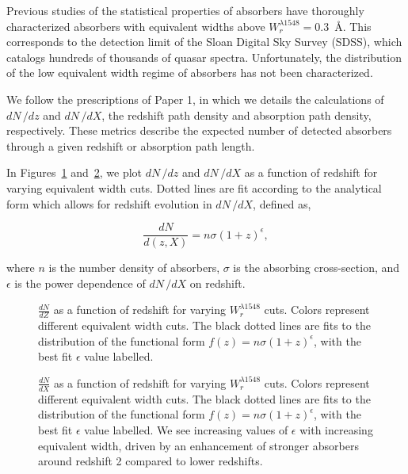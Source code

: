 \documentclass[linenumbers,twocolumn]{aastex61}
\begin{document}
Previous studies of the statistical properties of {\CIV} absorbers have thoroughly characterized {\CIV} absorbers with equivalent widths above $W_r^{\lambda1548} = 0.3$~{\AA}. This corresponds to the detection limit of the Sloan Digital Sky Survey (SDSS), which catalogs hundreds of thousands of quasar spectra. Unfortunately, the distribution of the low equivalent width regime of {\CIV} absorbers has not been characterized.

We follow the prescriptions of Paper 1, in which we details the calculations of $dN\,/dz$ and $dN\,/dX$, the redshift path density and absorption path density, respectively. These metrics describe the expected number of detected absorbers through a given redshift or absorption path length.

In Figures~\ref{fig:dndz_cuts} and~\ref{fig:dndx_cuts}, we plot $dN\,/dz$ and $dN\,/dX$ as a function of redshift for varying equivalent width cuts. Dotted lines are fit according to the analytical form which allows for redshift evolution in $dN\,/dX$, defined as,

\begin{equation}
\frac{dN}{d(z,X)} = n\sigma (1 + z)^{\epsilon},
\label{eqn:dndxfit}
\end{equation}

where $n$ is the number density of {\CIV} absorbers, $\sigma$ is the absorbing cross-section, and $\epsilon$ is the power dependence of $dN\,/dX$ on redshift.

\begin{figure}[bth]
\caption{$\frac{dN}{dZ}$ as a function of redshift for varying $W_r^{\lambda1548}$ cuts. Colors represent different equivalent width cuts. The black dotted lines are fits to the distribution of the functional form $f(z) = n\sigma (1 + z)^{\epsilon}$, with the best fit $\epsilon$ value labelled.}
\label{fig:dndz_cuts}
\end{figure}

\begin{figure}[bth]
\caption{$\frac{dN}{dX}$ as a function of redshift for varying $W_r^{\lambda1548}$ cuts. Colors represent different equivalent width cuts. The black dotted lines are fits to the distribution of the functional form $f(z) = n\sigma (1 + z)^{\epsilon}$, with the best fit $\epsilon$ value labelled. We see increasing values of $\epsilon$ with increasing equivalent width, driven by an enhancement of stronger {\CIV} absorbers around redshift 2 compared to lower redshifts.}
\label{fig:dndx_cuts}
\end{figure}
\end{document}
